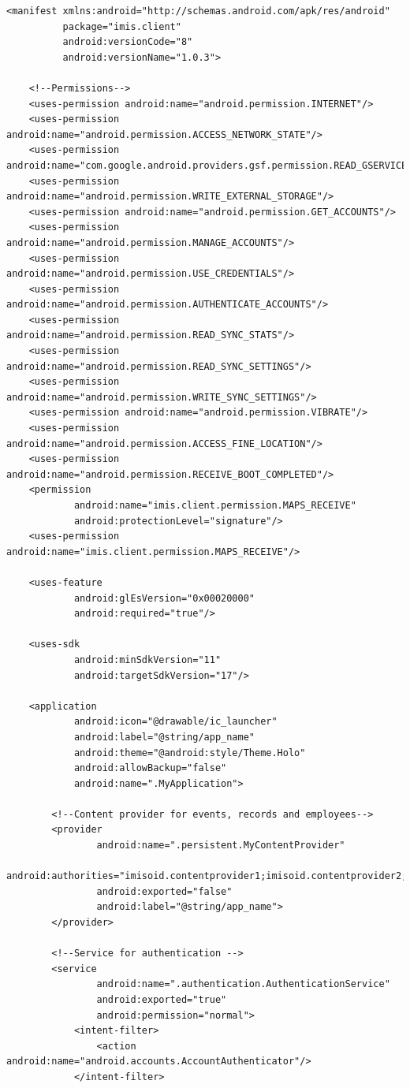 \documentclass{diplomka}
\begin{document}
\begin{lstlisting}
<manifest xmlns:android="http://schemas.android.com/apk/res/android"
          package="imis.client"
          android:versionCode="8"
          android:versionName="1.0.3">

    <!--Permissions-->
    <uses-permission android:name="android.permission.INTERNET"/>
    <uses-permission android:name="android.permission.ACCESS_NETWORK_STATE"/>
    <uses-permission android:name="com.google.android.providers.gsf.permission.READ_GSERVICES"/>
    <uses-permission android:name="android.permission.WRITE_EXTERNAL_STORAGE"/>
    <uses-permission android:name="android.permission.GET_ACCOUNTS"/>
    <uses-permission android:name="android.permission.MANAGE_ACCOUNTS"/>
    <uses-permission android:name="android.permission.USE_CREDENTIALS"/>
    <uses-permission android:name="android.permission.AUTHENTICATE_ACCOUNTS"/>
    <uses-permission android:name="android.permission.READ_SYNC_STATS"/>
    <uses-permission android:name="android.permission.READ_SYNC_SETTINGS"/>
    <uses-permission android:name="android.permission.WRITE_SYNC_SETTINGS"/>
    <uses-permission android:name="android.permission.VIBRATE"/>
    <uses-permission android:name="android.permission.ACCESS_FINE_LOCATION"/>
    <uses-permission android:name="android.permission.RECEIVE_BOOT_COMPLETED"/>
    <permission
            android:name="imis.client.permission.MAPS_RECEIVE"
            android:protectionLevel="signature"/>
    <uses-permission android:name="imis.client.permission.MAPS_RECEIVE"/>

    <uses-feature
            android:glEsVersion="0x00020000"
            android:required="true"/>

    <uses-sdk
            android:minSdkVersion="11"
            android:targetSdkVersion="17"/>

    <application
            android:icon="@drawable/ic_launcher"
            android:label="@string/app_name"
            android:theme="@android:style/Theme.Holo"
            android:allowBackup="false"
            android:name=".MyApplication">

        <!--Content provider for events, records and employees-->
        <provider
                android:name=".persistent.MyContentProvider"
                android:authorities="imisoid.contentprovider1;imisoid.contentprovider2;imisoid.contentprovider3"
                android:exported="false"
                android:label="@string/app_name">
        </provider>

        <!--Service for authentication -->
        <service
                android:name=".authentication.AuthenticationService"
                android:exported="true"
                android:permission="normal">
            <intent-filter>
                <action android:name="android.accounts.AccountAuthenticator"/>
            </intent-filter>


\end{lstlisting}
\end{document}
